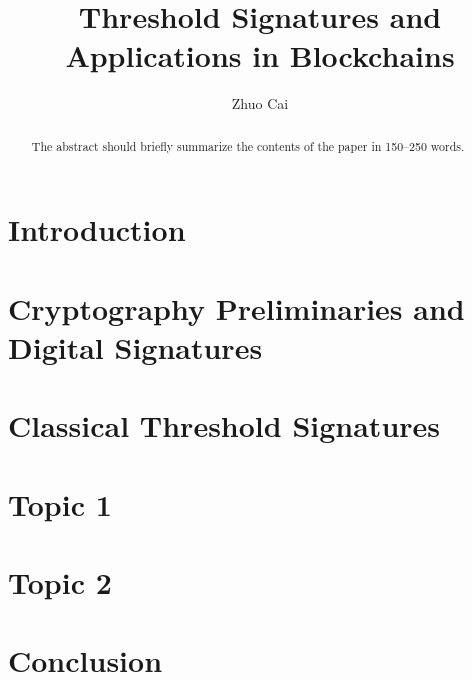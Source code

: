 \documentclass[runningheads]{llncs}
\begin{document}
%
\title{Threshold Signatures and Applications in Blockchains}
%
%
\author{Zhuo Cai}
%
%
%
\maketitle              %
%
\begin{abstract}
The abstract should briefly summarize the contents of the paper in
150--250 words.
\end{abstract}
%
%

\section{Introduction}


\section{Cryptography Preliminaries and Digital Signatures}


\section{Classical Threshold Signatures}



\section{Topic 1}


\section{Topic 2}


\section{Conclusion}







\end{document}
